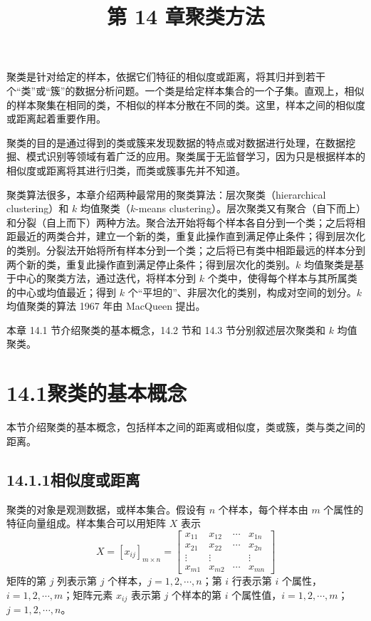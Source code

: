 \documentclass[UTF8, 12pt, fontset=fandol, oneside]{ctexart}
\title{第 14 章\quad 聚类方法}
\author{}
\date{}
\begin{document}
\maketitle

聚类是针对给定的样本，依据它们特征的相似度或距离，将其归并到若干个“类”或“簇”的数据分析问题。一个类是给定样本集合的一个子集。直观上，相似的样本聚集在相同的类，不相似的样本分散在不同的类。这里，样本之间的相似度或距离起着重要作用。

聚类的目的是通过得到的类或簇来发现数据的特点或对数据进行处理，在数据挖掘、模式识别等领域有着广泛的应用。聚类属于无监督学习，因为只是根据样本的相似度或距离将其进行归类，而类或簇事先并不知道。

聚类算法很多，本章介绍两种最常用的聚类算法：层次聚类（hierarchical clustering）和 $k$ 均值聚类（$k$-means clustering）。层次聚类又有聚合（自下而上）和分裂（自上而下）两种方法。聚合法开始将每个样本各自分到一个类；之后将相距最近的两类合并，建立一个新的类，重复此操作直到满足停止条件；得到层次化的类别。分裂法开始将所有样本分到一个类；之后将已有类中相距最远的样本分到两个新的类，重复此操作直到满足停止条件；得到层次化的类别。$k$ 均值聚类是基于中心的聚类方法，通过迭代，将样本分到 $k$ 个类中，使得每个样本与其所属类的中心或均值最近；得到 $k$ 个“平坦的”、非层次化的类别，构成对空间的划分。$k$ 均值聚类的算法 1967 年由 MacQueen 提出。

本章 14.1 节介绍聚类的基本概念，14.2 节和 14.3 节分别叙述层次聚类和 $k$ 均值聚类。

\section*{14.1\quad 聚类的基本概念}

本节介绍聚类的基本概念，包括样本之间的距离或相似度，类或簇，类与类之间的距离。

\subsection*{14.1.1\quad 相似度或距离}

聚类的对象是观测数据，或样本集合。假设有 $n$ 个样本，每个样本由 $m$ 个属性的特征向量组成。样本集合可以用矩阵 $X$ 表示
\begin{equation}
X=[x_{ij}]_{m\times n}=
\begin{bmatrix}
x_{11} & x_{12} & \cdots & x_{1n}\\
x_{21} & x_{22} & \cdots & x_{2n}\\
\vdots & \vdots & & \vdots\\
x_{m1} & x_{m2} & \cdots & x_{mn}
\end{bmatrix}
\tag{14.1}
\end{equation}
矩阵的第 $j$ 列表示第 $j$ 个样本，$j=1,2,\cdots,n$；第 $i$ 行表示第 $i$ 个属性，$i=1,2,\cdots,m$；矩阵元素 $x_{ij}$ 表示第 $j$ 个样本的第 $i$ 个属性值，$i=1,2,\cdots,m$；$j=1,2,\cdots,n$。
\end{document}
